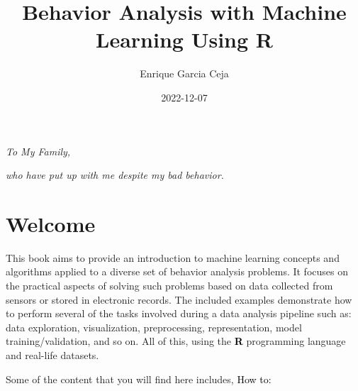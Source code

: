 \documentclass[
  11pt,
]{krantz}
\title{Behavior Analysis with Machine Learning Using R}
\author{Enrique Garcia Ceja}
\date{2022-12-07}
\begin{document}
\maketitle



\thispagestyle{empty}

\begin{center}
\emph{To My Family,}


\emph{who have put up with me despite my bad behavior.}

\end{center}

\setlength{\abovedisplayskip}{-5pt}
\setlength{\abovedisplayshortskip}{-5pt}

{
\hypersetup{linkcolor=}
\setcounter{tocdepth}{2}
\tableofcontents
}
\listoffigures
\hypertarget{welcome}{%
\chapter*{Welcome}\label{welcome}}


This book aims to provide an introduction to machine learning concepts and algorithms applied to a diverse set of behavior analysis problems. It focuses on the practical aspects of solving such problems based on data collected from sensors or stored in electronic records. The included examples demonstrate how to perform several of the tasks involved during a data analysis pipeline such as: data exploration, visualization, preprocessing, representation, model training/validation, and so on. All of this, using the \textbf{\textcolor{black}{R}} programming language and real-life datasets.

Some of the content that you will find here includes, \textcolor{black}{How to:}
\end{document}
